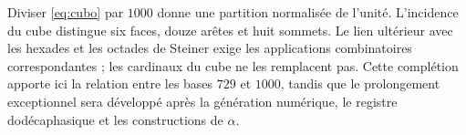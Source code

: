 Diviser \eqref{eq:cubo} par \(1000\) donne une partition normalisée de l’unité. L’incidence du cube distingue six faces, douze arêtes et huit sommets. Le lien ultérieur avec les hexades et les octades de Steiner exige les applications combinatoires correspondantes ; les cardinaux du cube ne les remplacent pas. Cette complétion apporte ici la relation entre les bases \(729\) et \(1000\), tandis que le prolongement exceptionnel sera développé après la génération numérique, le registre dodécaphasique et les constructions de \(\alpha\).





